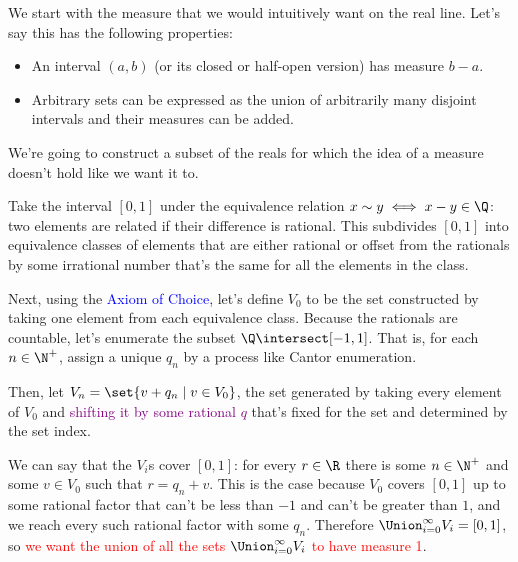 \documentclass[../analysis.tex]{subfiles}
\begin{document}
    We start with the measure that we would intuitively want on the real line. Let's say this has the following properties:

    \begin{itemize}
        \setlength\itemsep{1pt}
        \item An interval $(a, b)$ (or its closed or half-open version) has measure $b - a$.
        \item Arbitrary sets can be expressed as the union of arbitrarily many disjoint intervals and their measures can be added.
    \end{itemize}
    
    We're going to construct a subset of the reals for which the idea of a measure doesn't hold like we want it to.

    Take the interval $[0, 1]$ under the equivalence relation $x \sim y \iff x - y \in \Q$: two elements are related if their difference is rational. This subdivides $[0, 1]$ into equivalence classes of elements that are either rational or offset from the rationals by some irrational number that's the same for all the elements in the class. %

    Next, using the \textcolor{blue}{Axiom of Choice}, let's define $V_0$ to be the set constructed by taking one element from each equivalence class. Because the rationals are countable, let's enumerate the subset $\Q \intersect [-1, 1]$. That is, for each $n \in \N^+$, assign a unique $q_n$ by a process like Cantor enumeration. 
    
    Then, let $V_n = \set{v + q_n \mid v \in V_0}$, the set generated by taking every element of $V_0$ and \textcolor{purple}{shifting it by some rational $q$} that's fixed for the set and determined by the set index.


    We can say that the $V_i$s cover $[0, 1]$: for every $r \in \R$ there is some $n \in \N^+$ and some $v \in V_0$ such that $r = q_n + v$. This is the case because $V_0$ covers $[0, 1]$ up to some rational factor that can't be less than $-1$ and can't be greater than $1$, and we reach every such rational factor with some $q_n$. Therefore $\Union_{i=0}^\infty V_i = [0, 1]$, so \textcolor{red}{we want the union of all the sets $\Union_{i=0}^\infty V_i$ to have measure 1}.
\end{document}
